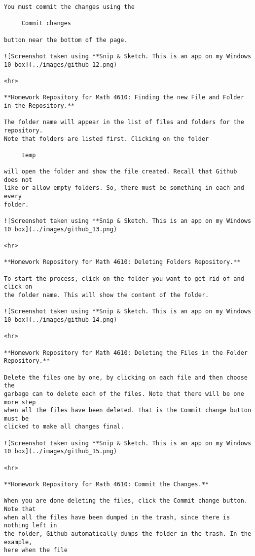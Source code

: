 \begin{verbatim}
You must commit the changes using the

     Commit changes

button near the bottom of the page.

![Screenshot taken using **Snip & Sketch. This is an app on my Windows 10 box](../images/github_12.png)

<hr>

**Homework Repository for Math 4610: Finding the new File and Folder in the Repository.** 

The folder name will appear in the list of files and folders for the repository.
Note that folders are listed first. Clicking on the folder

     temp

will open the folder and show the file created. Recall that Github does not
like or allow empty folders. So, there must be something in each and every
folder.

![Screenshot taken using **Snip & Sketch. This is an app on my Windows 10 box](../images/github_13.png)

<hr>

**Homework Repository for Math 4610: Deleting Folders Repository.**

To start the process, click on the folder you want to get rid of and click on
the folder name. This will show the content of the folder.

![Screenshot taken using **Snip & Sketch. This is an app on my Windows 10 box](../images/github_14.png)

<hr>

**Homework Repository for Math 4610: Deleting the Files in the Folder Repository.**

Delete the files one by one, by clicking on each file and then choose the
garbage can to delete each of the files. Note that there will be one more step
when all the files have been deleted. That is the Commit change button must be
clicked to make all changes final.

![Screenshot taken using **Snip & Sketch. This is an app on my Windows 10 box](../images/github_15.png)

<hr>

**Homework Repository for Math 4610: Commit the Changes.**

When you are done deleting the files, click the Commit change button. Note that
when all the files have been dumped in the trash, since there is nothing left in
the folder, Github automatically dumps the folder in the trash. In the example,
here when the file 


\end{verbatim}
